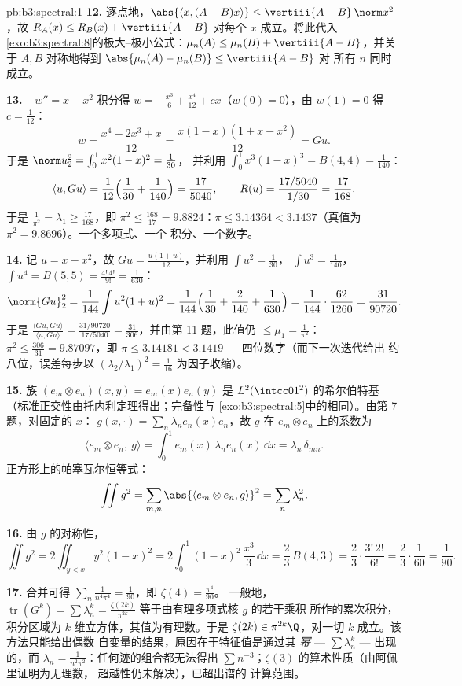 \begin{solution}{pb:b3:spectral:1}
\textbf{12.} 逐点地，$\abs{\langle x, (A - B)x\rangle}
\leq \vertiii{A - B}\,\norm x^2$，故 $R_A(x) \leq R_B(x) +
\vertiii{A - B}$ 对每个 $x$ 成立。将此代入
\cref{exo:b3:spectral:8}的极大–极小公式：$\mu_n(A)
\leq \mu_n(B) + \vertiii{A - B}$，并关于 $A,
B$ 对称地得到 $\abs{\mu_n(A) - \mu_n(B)} \leq \vertiii{A - B}$ 对
所有 $n$ 同时成立。

\textbf{13.} $-w'' = x - x^2$ 积分得 $w = -\frac{x^3}6
+ \frac{x^4}{12} + cx$（$w(0) = 0$），由 $w(1) = 0$
得 $c = \frac1{12}$：
\[
w = \frac{x^4 - 2x^3 + x}{12} = \frac{x(1-x)(1 + x -
x^2)}{12} = Gu .
\]
于是 $\norm u_2^2 = \int_0^1x^2(1-x)^2 = \frac1{30}$，
并利用 $\int_0^1x^3(1-x)^3 = B(4,4) = \frac1{140}$：
\[
\langle u, Gu\rangle = \frac1{12}\Bigl(\frac1{30} +
\frac1{140}\Bigr) = \frac{17}{5040},
\qquad
R(u) = \frac{17/5040}{1/30} = \frac{17}{168} .
\]
于是 $\frac1{\pi^2} = \lambda_1 \geq \frac{17}{168}$，即
$\pi^2 \leq \frac{168}{17} = 9.8824$：$\pi \leq 3.14364 <
3.1437$（真值为 $\pi^2 = 9.8696$）。一个多项式、一个
积分、一个数字。

\textbf{14.} 记 $u = x - x^2$，故 $Gu =
\frac{u(1 + u)}{12}$，并利用 $\int u^2 = \frac1{30}$，
$\int u^3 = \frac1{140}$，$\int u^4 = B(5,5) =
\frac{4!\,4!}{9!} = \frac1{630}$：
\[
\norm{Gu}_2^2 = \frac1{144}\int u^2(1+u)^2 =
\frac1{144}\Bigl(\frac1{30} + \frac2{140} +
\frac1{630}\Bigr) = \frac1{144}\cdot\frac{62}{1260} =
\frac{31}{90720} .
\]
于是 $\frac{\langle Gu, Gu\rangle}{\langle u, Gu\rangle} =
\frac{31/90720}{17/5040} = \frac{31}{306}$，并由第
11 题，此值仍 $\leq \mu_1 = \frac1{\pi^2}$：$\pi^2 \leq
\frac{306}{31} = 9.87097$，即 $\pi \leq 3.14181 <
3.1419$ --- 四位数字（而下一次迭代给出
约八位，误差每步以
$(\lambda_2/\lambda_1)^2 = \frac1{16}$ 为因子收缩）。

\textbf{15.} 族 $(e_m \otimes e_n)(x,y) =
e_m(x)e_n(y)$ 是 $L^2(\intcc01^2)$ 的希尔伯特基
（标准正交性由托内利定理得出；完备性与
\cref{exo:b3:spectral:5}中的相同）。由第 7 题，对固定的 $x$：
$g(x, \cdot) = \sum_n\lambda_ne_n(x)e_n$，故
$g$ 在 $e_m\otimes e_n$ 上的系数为
\[
\langle e_m\otimes e_n,\ g\rangle
= \int_0^1 e_m(x)\,\lambda_n e_n(x)\,\dd x
= \lambda_n\,\delta_{mn} .
\]
正方形上的帕塞瓦尔恒等式：
\[
\iint g^2 = \sum_{m,n}\abs{\langle e_m\otimes e_n,
g\rangle}^2 = \sum_n\lambda_n^2 .
\]

\textbf{16.} 由 $g$ 的对称性，
\[
\iint g^2 = 2\iint_{y<x}y^2(1-x)^2
= 2\int_0^1(1-x)^2\,\frac{x^3}3\,\dd x
= \frac23\,B(4, 3) = \frac23\cdot\frac{3!\,2!}{6!}
= \frac23\cdot\frac1{60} = \frac1{90} .
\]

\textbf{17.} 合并可得 $\sum_n\frac1{n^4\pi^4} =
\frac1{90}$，即 $\zeta(4) = \frac{\pi^4}{90}$。
一般地，$\operatorname{tr}(G^k) = \sum\lambda_n^k =
\frac{\zeta(2k)}{\pi^{2k}}$ 等于由有理多项式核 $g$ 的若干乘积
所作的累次积分，积分区域为
$k$ 维立方体，其值为有理数。于是 $\zeta(2k) \in
\pi^{2k}\Q$，对一切 $k$ 成立。该方法只能给出偶数
自变量的结果，原因在于特征值是通过其
\emph{幂} --- $\sum\lambda_n^k$ --- 出现的，而 $\lambda_n =
\frac1{n^2\pi^2}$：任何迹的组合都无法得出 $\sum
n^{-3}$；$\zeta(3)$ 的算术性质（由阿佩里证明为无理数，
超越性仍未解决），已超出谱的
计算范围。


\end{solution}
